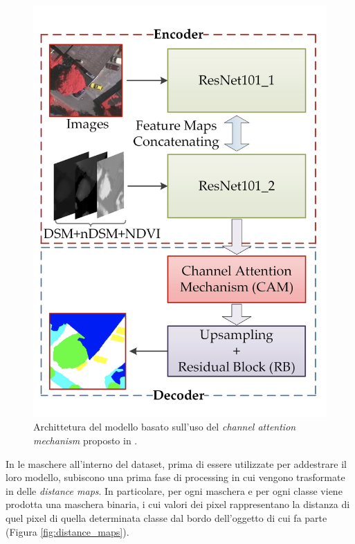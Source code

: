 \begin{figure}[h!]
    \centering
    \hspace*{0in}
    \includegraphics[scale=0.3]{img/chanel_attention_archi.png}
    \caption{Archittetura del modello basato sull'uso del \textit{channel attention mechanism} proposto in \cite{luo2019high}.}
    \label{fig:channel_attention}
\end{figure}





In \cite{distance_map} le maschere all'interno del dataset, prima di essere utilizzate per addestrare il loro modello, subiscono una prima fase di processing in cui vengono trasformate in delle \textit{distance maps}. In particolare, per ogni maschera e per ogni classe viene prodotta una maschera binaria, i cui valori dei pixel rappresentano la distanza di quel pixel di quella determinata classe dal bordo dell'oggetto di cui fa parte (Figura \ref{fig:distance_maps}).

